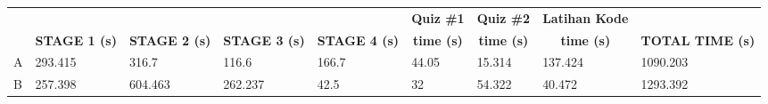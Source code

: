 \begin{landscape}
\begin{longtable}[c]{|l|llllllll|}
    \rowcolor[HTML]{C0C0C0}
    \multicolumn{1}{|c|}{\cellcolor[HTML]{C0C0C0}}                                  & \multicolumn{1}{c|}{\cellcolor[HTML]{C0C0C0}}                                       & \multicolumn{1}{c|}{\cellcolor[HTML]{C0C0C0}}                                       & \multicolumn{1}{c|}{\cellcolor[HTML]{C0C0C0}}                                       & \multicolumn{1}{c|}{\cellcolor[HTML]{C0C0C0}}                                       & \multicolumn{1}{c|}{\cellcolor[HTML]{C0C0C0}\textbf{Quiz \#1}} & \multicolumn{1}{c|}{\cellcolor[HTML]{C0C0C0}\textbf{Quiz \#2}} & \multicolumn{1}{c|}{\cellcolor[HTML]{C0C0C0}\textbf{Latihan Kode}} & \multicolumn{1}{c|}{\cellcolor[HTML]{C0C0C0}}                                          \\ \cline{6-8}
    \rowcolor[HTML]{C0C0C0}
    \multicolumn{1}{|c|}{\multirow{-4}{*}{\cellcolor[HTML]{C0C0C0}\textbf{SUBJEK}}} & \multicolumn{1}{c|}{\multirow{-2}{*}{\cellcolor[HTML]{C0C0C0}\textbf{STAGE 1 (s)}}} & \multicolumn{1}{c|}{\multirow{-2}{*}{\cellcolor[HTML]{C0C0C0}\textbf{STAGE 2 (s)}}} & \multicolumn{1}{c|}{\multirow{-2}{*}{\cellcolor[HTML]{C0C0C0}\textbf{STAGE 3 (s)}}} & \multicolumn{1}{c|}{\multirow{-2}{*}{\cellcolor[HTML]{C0C0C0}\textbf{STAGE 4 (s)}}} & \multicolumn{1}{c|}{\cellcolor[HTML]{C0C0C0}\textbf{time (s)}} & \multicolumn{1}{c|}{\cellcolor[HTML]{C0C0C0}\textbf{time (s)}} & \multicolumn{1}{c|}{\cellcolor[HTML]{C0C0C0}\textbf{time (s)}}     & \multicolumn{1}{c|}{\multirow{-3}{*}{\cellcolor[HTML]{C0C0C0}\textbf{TOTAL TIME (s)}}} \\ \hline
    \endhead
    A                                                                               & \multicolumn{1}{l|}{293.415}                                                        & \multicolumn{1}{l|}{316.7}                                                          & \multicolumn{1}{l|}{116.6}                                                          & \multicolumn{1}{l|}{166.7}                                                          & \multicolumn{1}{l|}{44.05}                                     & \multicolumn{1}{l|}{15.314}                                    & \multicolumn{1}{l|}{137.424}                                       & 1090.203                                                                               \\ \hline
    B                                                                               & \multicolumn{1}{l|}{257.398}                                                        & \multicolumn{1}{l|}{604.463}                                                        & \multicolumn{1}{l|}{262.237}                                                        & \multicolumn{1}{l|}{42.5}                                                           & \multicolumn{1}{l|}{32}                                        & \multicolumn{1}{l|}{54.322}                                    & \multicolumn{1}{l|}{40.472}                                        & 1293.392                                                                               \\ \hline

\end{longtable}
\end{landscape}
